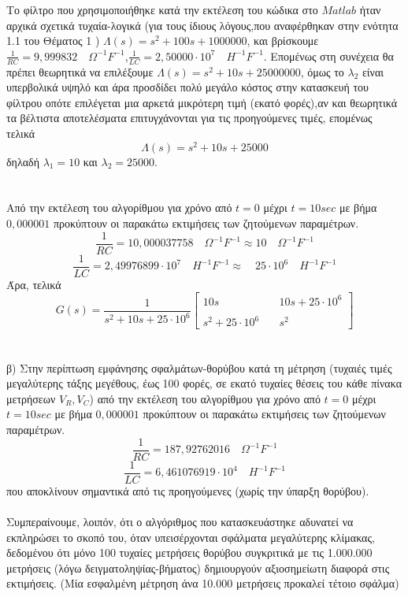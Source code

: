 \documentclass[12pt]{article}
\begin{document}
Το φίλτρο που χρησιμοποιήθηκε κατά την εκτέλεση του κώδικα στο $Matlab$ ήταν αρχικά σχετικά τυχαία-λογικά (για τους ίδιους λόγους,που αναφέρθηκαν στην ενότητα 1.1 του Θέματος 1 ) $\Lambda(s)=s^{2}+100s+1000000$, και βρίσκουμε $\frac{1}{RC} = 9,999832 \quad \Omega^{-1}F^{-1}$,$\frac{1}{LC} = 2,50000 \cdot 10^{7} \quad H^{-1}F^{-1}$. Επομένως στη συνέχεια θα πρέπει θεωρητικά να επιλέξουμε  $\Lambda(s)=s^{2}+10s+25000000$, όμως το $\lambda_{2}$ είναι υπερβολικά υψηλό και άρα προσδίδει πολύ μεγάλο κόστος στην κατασκευή του φίλτρου οπότε επιλέγεται μια αρκετά μικρότερη τιμή (εκατό φορές),αν και θεωρητικά τα βέλτιστα αποτελέσματα επιτυγχάνονται για τις προηγούμενες τιμές, επομένως τελικά \\
\[\Lambda(s)=s^{2}+10s+25000\]
δηλαδή $\lambda_{1}=10$ και $\lambda_{2}=25000$.
\\ \\ \\
Από την εκτέλεση του αλγορίθμου για χρόνο από $t=0$  μέχρι $t=10 sec$ με βήμα $0,000001$ προκύπτουν οι παρακάτω εκτιμήσεις των ζητούμενων παραμέτρων.
\\
\[\frac{1}{RC} =  10,000037758 \quad \Omega^{-1}F^{-1} \approx 10 \quad \Omega^{-1}F^{-1} \]
\[\frac{1}{LC} = 2,49976899 \cdot  10^{7} \quad H^{-1}F^{-1} \approx \quad 25 \cdot 10^{6} \quad H^{-1}F^{-1} \]
Άρα, τελικά
\[
G(s)=\frac{1}{s^{2}+10 s+25 \cdot 10^{6}}
\begin{bmatrix}
    10 s  & \quad 10s+25 \cdot 10^{6} \\ \\
   s^{2}+25 \cdot 10^{6}  & \quad s^{2} 
\end{bmatrix}
\]
\\ \\
β) Στην περίπτωση εμφάνησης σφαλμάτων-θορύβου κατά τη μέτρηση (τυχαιές τιμές μεγαλύτερης τάξης μεγέθους, έως 100 φορές, σε εκατό τυχαίες θέσεις του κάθε πίνακα μετρήσεων $V_{R},V_{C}$) από την εκτέλεση του αλγορίθμου για χρόνο από $t=0$  μέχρι $t=10 sec$ με βήμα  $0,000001$ προκύπτουν οι παρακάτω εκτιμήσεις των ζητούμενων παραμέτρων.
\[\frac{1}{RC} = 187,92762016 \quad \Omega^{-1}F^{-1}\]
\[\frac{1}{LC} = 6,461076919 \cdot 10^{4} \quad H^{-1}F^{-1}\]
που αποκλίνουν σημαντικά από τις προηγούμενες (χωρίς την ύπαρξη θορύβου). 
\\ \\
 Συμπεραίνουμε, λοιπόν, ότι ο αλγόριθμος που κατασκευάστηκε αδυνατεί να εκπληρώσει το σκοπό του, όταν υπεισέρχονται σφάλματα μεγαλύτερης κλίμακας, δεδομένου ότι μόνο 100 τυχαίες μετρήσεις θορύβου συγκριτικά με τις 1.000.000 μετρήσεις (λόγω δειγματοληψίας-βήματος) δημιουργούν αξιοσημείωτη διαφορά στις εκτιμήσεις. (Μία εσφαλμένη μέτρηση άνα 10.000  μετρήσεις προκαλεί τέτοιο σφάλμα)
\end{document}
